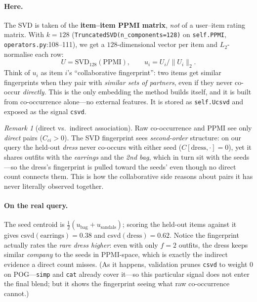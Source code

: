 \documentclass[11pt]{article}
\theoremstyle{remark}
\newtheorem{remark}{Remark}
\newcommand{\code}[1]{\texttt{\small #1}}
\begin{document}
\paragraph{Here.} The SVD is taken of the \textbf{item--item PPMI matrix}, \emph{not} of a user--item rating matrix.
With $k=128$ (\code{TruncatedSVD(n\_components=128)} on \code{self.PPMI}, \code{operators.py}:108--111), we get a
$128$-dimensional vector per item and $L_2$-normalise each row:
\[
  U=\mathrm{SVD}_{128}(\mathrm{PPMI}),\qquad u_i=U_i/\lVert U_i\rVert_2 .
\]
Think of $u_i$ as item $i$'s ``collaborative fingerprint'': two items get similar fingerprints when they pair with
\emph{similar sets of partners}, even if they never co-occur \emph{directly}. This is the only embedding the method
builds itself, and it is built from co-occurrence alone---no external features. It is stored as \code{self.Ucsvd}
and exposed as the signal \code{csvd}.

\begin{remark}[direct vs.\ indirect association]
Raw co-occurrence and PPMI see only \emph{direct} pairs ($C_{ci}>0$). The SVD fingerprint sees \emph{second-order}
structure: on our query the held-out \emph{dress} never co-occurs with either seed ($C[\text{dress},\cdot]=0$), yet
it shares outfits with the \emph{earrings} and the \emph{2nd bag}, which in turn sit with the seeds---so the dress's
fingerprint is pulled toward the seeds' even though no direct count connects them. This is how the collaborative side
reasons about pairs it has never literally observed together.
\end{remark}

\paragraph{On the real query.} The seed centroid is $\tfrac12(u_{\text{bag}}+u_{\text{sandals}})$; scoring the held-out
items against it gives $\mathrm{csvd}(\text{earrings})=0.38$ and $\mathrm{csvd}(\text{dress})=\mathbf{0.62}$. Notice the
fingerprint actually rates the \emph{rare dress higher}: even with only $f=2$ outfits, the dress keeps similar
\emph{company} to the seeds in PPMI-space, which is exactly the indirect evidence a direct count misses. (As it
happens, validation prunes \code{csvd} to weight $0$ on \textsc{POG}---\code{simp} and \code{cat} already cover it---so
this particular signal does not enter the final blend; but it shows the fingerprint seeing what raw co-occurrence cannot.)
\end{document}
